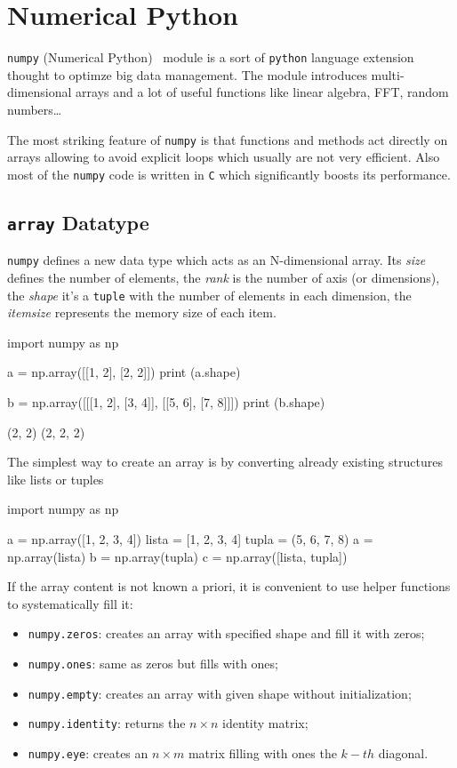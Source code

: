 \chapter{Numerical Python}
\label{ch:numerical_python}

\texttt{numpy} (Numerical Python)~\cite{bib:numpy} module is a sort of \texttt{python} language extension thought to optimze big data management.
The module introduces multi-dimensional arrays and a lot of useful functions like linear algebra, FFT, random numbers\ldots

The most striking feature of \texttt{numpy} is that functions and methods act directly on arrays allowing to avoid explicit loops which usually are not very efficient. Also most of the \texttt{numpy} code is written in \texttt{C} which significantly boosts its performance. 

\section{\texttt{array} Datatype}

\texttt{numpy} defines a new data type which acts as an N-dimensional array. Its \emph{size} defines the number of elements, the \emph{rank} is the number of axis (or dimensions), the \emph{shape} it's a \texttt{tuple} with the number of elements in each dimension, the \emph{itemsize} represents the memory size of each item.

\begin{ipythonnon}
import numpy as np

a = np.array([[1, 2], [2, 2]])
print (a.shape)

b = np.array([[[1, 2], [3, 4]], [[5, 6], [7, 8]]])
print (b.shape)
\end{ipythonnon}
\begin{ioutput}
(2, 2)
(2, 2, 2)
\end{ioutput}

The simplest way to create an array is by converting already existing structures like lists or tuples

\begin{ipythonnon}
import numpy as np
 
a = np.array([1, 2, 3, 4])
lista = [1, 2, 3, 4]
tupla = (5, 6, 7, 8)
a = np.array(lista)
b = np.array(tupla)
c = np.array([lista, tupla])
\end{ipythonnon}

If the array content is not known a priori, it is convenient to use helper functions to systematically fill it:
\begin{itemize}
\item \texttt{numpy.zeros}: creates an array with specified shape and fill it with zeros;
\item \texttt{numpy.ones}: same as zeros but fills with ones;
\item \texttt{numpy.empty}: creates an array with given shape without initialization;
\item \texttt{numpy.identity}: returns the $n\times n$ identity matrix;
\item \texttt{numpy.eye}: creates an $n\times m$ matrix filling with ones the $k-th$ diagonal.
\end{itemize}

